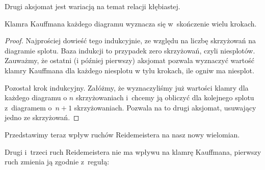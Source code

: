 Drugi aksjomat jest wariacją na temat relacji kłębiastej.

\begin{lemma}
    Klamra Kauffmana każdego diagramu wyznacza się w~skończenie wielu krokach.
\end{lemma}

\begin{proof}
    Najprościej dowieść tego indukcyjnie, ze względu na liczbę skrzyżowań na diagramie splotu.
    Baza indukcji to przypadek zero skrzyżowań, czyli niesplotów.
    Zauważmy, że ostatni (i później pierwszy) aksjomat pozwala wyznaczyć wartość klamry Kauffmana dla każdego niesplotu w tylu krokach, ile ogniw ma niesplot.

    Pozostał krok indukcyjny.
    Załóżmy, że wyznaczyliśmy już wartości klamry dla każdego diagramu o $n$ skrzyżowaniach i~chcemy ją obliczyć dla kolejnego splotu z~diagramem o~$n + 1$ skrzyżowaniach.
    Pozwala na to drugi aksjomat, usuwający jedno ze skrzyżowań.
\end{proof}

Przedstawimy teraz wpływ ruchów Reidemeistera na nasz nowy wielomian.

\begin{lemma}
    Drugi i~trzeci ruch Reidemeistera nie ma wpływu na klamrę Kauffmana,
    pierwszy ruch zmienia ją zgodnie z~regułą:

\end{lemma}


